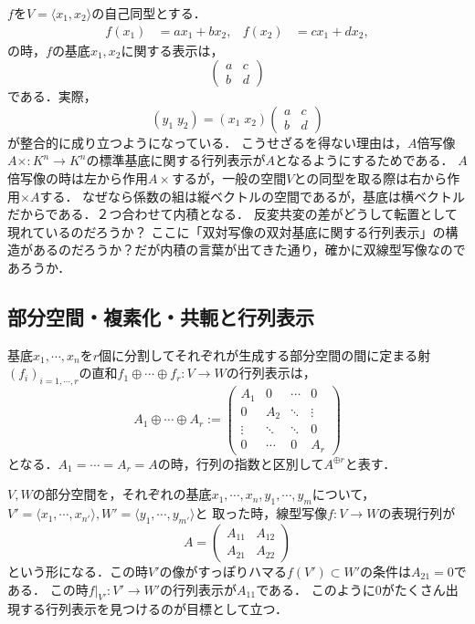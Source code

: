 \documentclass[uplatex, dvipdfmx]{jsreport}
\begin{document}
\begin{example}
    $f$を$V=\langle x_1,x_2\rangle$の自己同型とする．
    \begin{align*}
        f(x_1)&=ax_1+bx_2,&f(x_2)&=cx_1+dx_2,
    \end{align*}
    の時，$f$の基底$x_1,x_2$に関する表示は，
    \[ \begin{pmatrix}a&c\\b&d\end{pmatrix} \]
    である．実際，
    \[ (y_1\;y_2) = (x_1\;x_2)\begin{pmatrix}a&c\\b&d\end{pmatrix} \]
    が整合的に成り立つようになっている．
    こうせざるを得ない理由は，$A$倍写像$A\times:K^n\to K^n$の標準基底に関する行列表示が$A$となるようにするためである．
    $A$倍写像の時は左から作用$A\times$するが，一般の空間$V$との同型を取る際は右から作用$\times A$する．
    なぜなら係数の組は縦ベクトルの空間であるが，基底は横ベクトルだからである．２つ合わせて内積となる．
    反変共変の差がどうして転置として現れているのだろうか？
    ここに「双対写像の双対基底に関する行列表示」の構造があるのだろうか？だが内積の言葉が出てきた通り，確かに双線型写像なのであろうか．
\end{example}

\subsection{部分空間・複素化・共軛と行列表示}

\begin{definition}[行列の直和]
    基底$x_1,\cdots,x_n$を$r$個に分割してそれぞれが生成する部分空間の間に定まる射$(f_i)_{i=1,\cdots,r}$の直和$f_1\oplus\cdots\oplus f_r:V\to W$の行列表示は，
    \[ A_1\oplus\cdots\oplus A_r:=\begin{pmatrix}A_1&0&\cdots&0\\0&A_2&\ddots&\vdots\\\vdots&\ddots&\ddots&0\\0&\cdots&0&A_r\end{pmatrix} \]
    となる．$A_1=\cdots=A_r=A$の時，行列の指数と区別して$A^{\oplus r}$と表す．
\end{definition}

\begin{example}[部分空間と行列表示]
    $V,W$の部分空間を，それぞれの基底$x_1,\cdots,x_n,y_1,\cdots,y_m$について，$V'=\langle x_1,\cdots,x_{n'}\rangle,W'=\langle y_1,\cdots,y_{m'}\rangle$と
    取った時，線型写像$f:V\to W$の表現行列が
    \[ A=\begin{pmatrix}A_{11}&A_{12}\\A_{21}&A_{22}\end{pmatrix} \]
    という形になる．この時$V'$の像がすっぽりハマる$f(V')\subset W'$の条件は$A_{21}=0$である．
    この時$f|_{V'}:V'\to W'$の行列表示が$A_{11}$である．
    このように$0$がたくさん出現する行列表示を見つけるのが目標として立つ．
\end{example}
\end{document}
